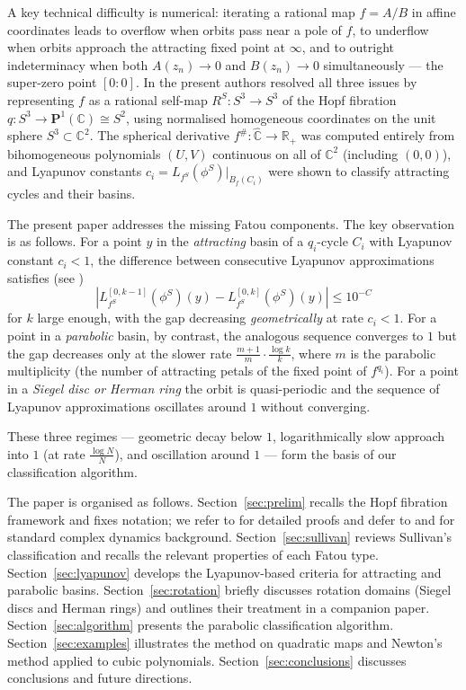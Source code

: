 \documentclass[12pt]{article}
\theoremstyle{definition}
\newcommand{\C}{\mathbb{C}}
\newcommand{\R}{\mathbb{R}}
\newcommand{\Chat}{\hat{\C}}
\newcommand{\Pone}{\mathbf{P}^1(\C)}
\newcommand{\fsh}{f^{\#}}            %
\newcommand{\RS}{R^S}
\begin{document}
A key technical difficulty is numerical: iterating a rational map
$f = A/B$ in affine coordinates leads to overflow when orbits pass near a
pole of $f$, to underflow when orbits approach the attracting fixed point
at $\infty$, and to outright indeterminacy when both $A(z_n) \to 0$ and
$B(z_n) \to 0$ simultaneously --- the super-zero point $[0:0]$.  In
\cite{Alvarez2023} the present authors resolved all three issues by
representing $f$ as a rational self-map $\RS: S^3 \to S^3$ of the Hopf
fibration $q: S^3 \to \Pone \cong S^2$, using normalised homogeneous
coordinates on the unit sphere $S^3 \subset \C^2$.  The spherical
derivative $\fsh: \Chat \to \R_+$ was computed entirely from bihomogeneous
polynomials $(U,V)$ continuous on all of $\C^2$ (including $(0,0)$), and
Lyapunov constants $c_i = L_{f^S}(\phi^S)|_{B_f(C_i)}$ were shown to
classify attracting cycles and their basins.

The present paper addresses the missing Fatou components.  The key
observation is as follows.  For a point $y$ in the \emph{attracting} basin
of a $q_i$-cycle $C_i$ with Lyapunov constant $c_i < 1$, the difference
between consecutive Lyapunov approximations satisfies (see
\cite[eq.~(29)]{Alvarez2023})
\[
  |L_{f^S}^{[0,k-1]}(\phi^S)(y) - L_{f^S}^{[0,k]}(\phi^S)(y)| \leq
  10^{-C}
\]
for $k$ large enough, with the gap decreasing \emph{geometrically} at rate
$c_i < 1$.  For a point in a \emph{parabolic} basin, by contrast, the
analogous sequence converges to $1$ but the gap decreases only
at the slower rate $\tfrac{m+1}{m}\cdot\tfrac{\log k}{k}$,
where $m$ is the parabolic multiplicity
(the number of attracting petals of the fixed point of $f^{q_i}$).  For a
point in a \emph{Siegel disc or Herman ring} the orbit is quasi-periodic
and the sequence of Lyapunov approximations oscillates around $1$ without
converging.

These three regimes --- geometric decay below $1$, logarithmically slow approach into $1$ (at rate $\tfrac{\log N}{N}$), and oscillation around $1$ --- form the basis of our classification
algorithm.

The paper is organised as follows.  Section~\ref{sec:prelim} recalls the
Hopf fibration framework and fixes notation; we refer to \cite{Alvarez2023}
for detailed proofs and defer to \cite{Milnor2006} and \cite{Beardon1991}
for standard complex dynamics background.  Section~\ref{sec:sullivan}
reviews Sullivan's classification and recalls the relevant properties of
each Fatou type.  Section~\ref{sec:lyapunov} develops the Lyapunov-based
criteria for attracting and parabolic basins.  Section~\ref{sec:rotation}
briefly discusses rotation domains (Siegel discs and Herman rings) and
outlines their treatment in a companion paper.  Section~\ref{sec:algorithm}
presents the parabolic classification algorithm.
Section~\ref{sec:examples} illustrates the method on quadratic maps and
Newton's method applied to cubic polynomials.  Section~\ref{sec:conclusions}
discusses conclusions and future directions.
\end{document}
